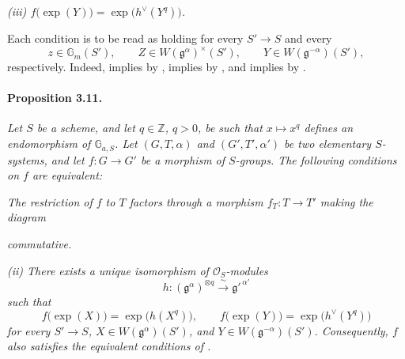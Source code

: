 \smallskip
\noindent\emph{\textup{(iii)}
\(f\bigl(\exp(Y)\bigr)=\exp\bigl(h^\vee(Y^q)\bigr)\).}

\smallskip
Each condition is to be read as holding for every \(S'\to S\) and
every
\[
  z\in\mathbb G_m(S'),\qquad
  Z\in W(\mathfrak g^\alpha)^\times(S'),\qquad
  Y\in W(\mathfrak g^{-\alpha})(S'),
\]
respectively.  Indeed, \textup{} implies \textup{} by ,
\textup{} implies \textup{} by , and \textup{}
implies \textup{} by .

\paragraph{\textbf{Proposition 3.11.}}
\emph{Let \(S\) be a scheme, and let \(q\in\mathbb Z\), \(q>0\), be
such that \(x\mapsto x^q\) defines an endomorphism of
\(\mathbb G_{a,S}\).  Let \((G,T,\alpha)\) and
\((G',T',\alpha')\) be two elementary \(S\)-systems, and let
\(f\colon G\to G'\) be a morphism of \(S\)-groups.  The following
conditions on \(f\) are equivalent:}

\smallskip
\noindent\emph{\textup{} The restriction of \(f\) to \(T\)
factors through a morphism \(f_T\colon T\to T'\) making the diagram}

\begin{center}
\end{center}

\noindent\emph{commutative.}

\smallskip
\noindent\emph{\textup{(ii)} There exists a unique isomorphism of
\(\mathcal O_S\)-modules}
\[
  h\colon(\mathfrak g^\alpha)^{\otimes q}
    \xrightarrow{\ \sim\ }\mathfrak g'^{\,\alpha'}
\]
\emph{such that}
\[
  f\bigl(\exp(X)\bigr)=\exp\bigl(h(X^q)\bigr),
  \qquad
  f\bigl(\exp(Y)\bigr)=\exp\bigl(h^\vee(Y^q)\bigr)
\]
\emph{for every \(S'\to S\),
\(X\in W(\mathfrak g^\alpha)(S')\), and
\(Y\in W(\mathfrak g^{-\alpha})(S')\).  Consequently, \(f\) also
satisfies the equivalent conditions of .}

